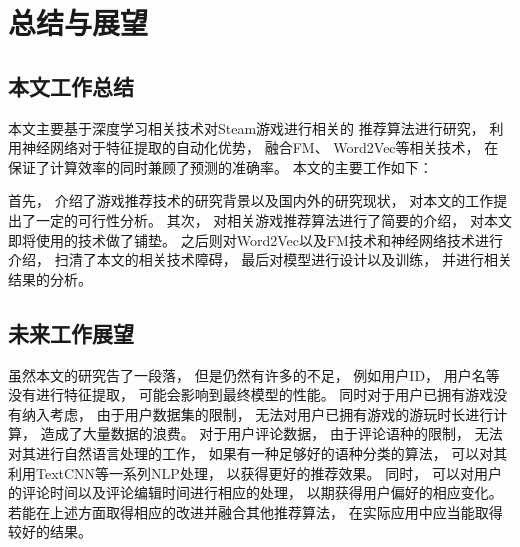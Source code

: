 \section{总结与展望}

\subsection{本文工作总结}

本文主要基于深度学习相关技术对Steam游戏进行相关的
推荐算法进行研究，
利用神经网络对于特征提取的自动化优势，
融合FM、
Word2Vec等相关技术，
在保证了计算效率的同时兼顾了预测的准确率。
本文的主要工作如下：

首先，
介绍了游戏推荐技术的研究背景以及国内外的研究现状，
对本文的工作提出了一定的可行性分析。
其次，
对相关游戏推荐算法进行了简要的介绍，
对本文即将使用的技术做了铺垫。
之后则对Word2Vec以及FM技术和神经网络技术进行介绍，
扫清了本文的相关技术障碍，
最后对模型进行设计以及训练，
并进行相关结果的分析。

\subsection{未来工作展望}

虽然本文的研究告了一段落，
但是仍然有许多的不足，
例如用户ID，
用户名等没有进行特征提取，
可能会影响到最终模型的性能。
同时对于用户已拥有游戏没有纳入考虑，
由于用户数据集的限制，
无法对用户已拥有游戏的游玩时长进行计算，
造成了大量数据的浪费。
对于用户评论数据，
由于评论语种的限制，
无法对其进行自然语言处理的工作，
如果有一种足够好的语种分类的算法，
可以对其利用TextCNN等一系列NLP处理，
以获得更好的推荐效果。
同时，
可以对用户的评论时间以及评论编辑时间进行相应的处理，
以期获得用户偏好的相应变化。
若能在上述方面取得相应的改进并融合其他推荐算法，
在实际应用中应当能取得较好的结果。